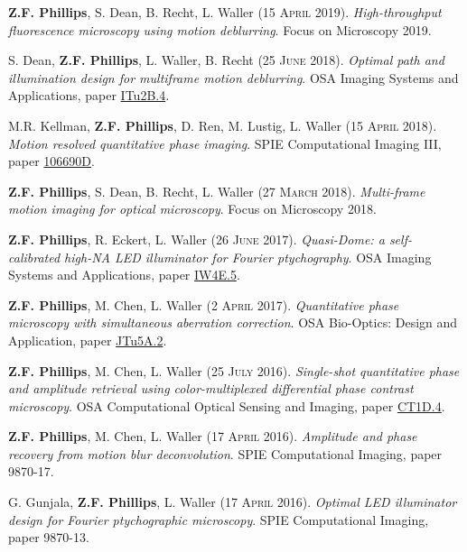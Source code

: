 \documentclass[12pt,letterpaper]{article}
\newcommand{\mhead}[1]{\leavevmode\marginpar{\raggedright\sffamily\footnotesize #1}}
\renewcommand{\date}[1]{#1}
\begin{document}
\medskip
\mhead{Conference Proceedings}%
\par\vspace{-\baselineskip}

\medskip
\textbf{Z.F. Phillips}, S. Dean, B. Recht, L. Waller (\date{15 \textsc{April} 2019}). \emph{High-throughput fluorescence microscopy using motion deblurring}. Focus on Microscopy 2019.

\medskip
S. Dean, \textbf{Z.F. Phillips}, L. Waller, B. Recht (\date{25 \textsc{June} 2018}). \emph{Optimal path and illumination design for multiframe motion deblurring}. OSA Imaging Systems and Applications, paper \href{https://doi.org/10.1364/ISA.2018.ITu2B.4}{ITu2B.4}.

\medskip
M.R. Kellman, \textbf{Z.F. Phillips}, D. Ren, M. Lustig, L. Waller (\date{15 \textsc{April} 2018}). \emph{Motion resolved quantitative phase imaging}. SPIE Computational Imaging III, paper \href{https://doi.org/10.1117/12.2300100}{106690D}.

\medskip
\textbf{Z.F. Phillips}, S. Dean, B. Recht, L. Waller (\date{27 \textsc{March} 2018}). \emph{Multi-frame motion imaging for optical microscopy}. Focus on Microscopy 2018.

\medskip
\textbf{Z.F. Phillips}, R. Eckert, L. Waller (\date{26 \textsc{June} 2017}). \emph{Quasi-Dome: a self-calibrated high-NA LED illuminator for Fourier ptychography}. OSA Imaging Systems and Applications, paper \href{https://doi.org/10.1364/ISA.2017.IW4E.5}{IW4E.5}.

\medskip
\textbf{Z.F. Phillips}, M. Chen, L. Waller (\date{2 \textsc{April} 2017}). \emph{Quantitative phase microscopy with simultaneous aberration correction}. OSA Bio-Optics: Design and Application, paper \href{https://doi.org/10.1364/BODA.2017.JTu5A.2}{JTu5A.2}.

\medskip
\textbf{Z.F. Phillips}, M. Chen, L. Waller (\date{25 \textsc{July} 2016}). \emph{Single-shot quantitative phase and amplitude retrieval using color-multiplexed differential phase contrast microscopy}. OSA Computational Optical Sensing and Imaging, paper \href{https://doi.org/10.1364/COSI.2016.CT1D.4}{CT1D.4}.

\medskip
\textbf{Z.F. Phillips}, M. Chen, L. Waller (\date{17 \textsc{April} 2016}). \emph{Amplitude and phase recovery from motion blur deconvolution}. SPIE Computational Imaging, paper 9870-17.

\medskip
G. Gunjala, \textbf{Z.F. Phillips}, L. Waller (\date{17 \textsc{April} 2016}). \emph{Optimal LED illuminator design for Fourier ptychographic microscopy}. SPIE Computational Imaging, paper 9870-13.
\end{document}
